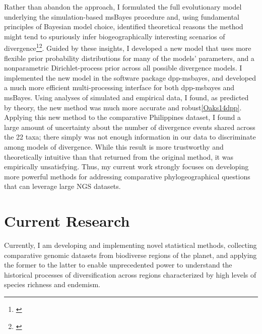 Rather than abandon the approach, I formulated the full evolutionary model
underlying the simulation-based msBayes procedure and, using fundamental
principles of Bayesian model choice, identified theoretical reasons the method
might tend to spuriously infer biogeographically interesting scenarios of
divergence\footnote{\label{Oaks12}}\super{,}\footnote{\label{Oaks14reply}}.
Guided by these insights, I developed a new model that uses more flexible prior
probability distributions for many of the models' parameters, and a
nonparametric Dirichlet-process prior across all possible divergence models.
I implemented the new model in the software package dpp-msbayes, and developed
a much more efficient multi-processing interface for both dpp-msbayes and
msBayes.
Using analyses of simulated and empirical data, I found, as predicted by
theory, the new method was much more accurate and robust\cref{Oaks14dpp}.
Applying this new method to the comparative Philippines dataset, I found a
large amount of uncertainty about the number of divergence events shared across
the 22 taxa; there simply was not enough information in our data to
discriminate among models of divergence.
While this result is more trustworthy and theoretically intuitive than that
returned from the original method, it was empirically unsatisfying.
Thus, my current work strongly focuses on developing more powerful methods for
addressing comparative phylogeographical questions that can leverage large NGS
datasets.


\section*{Current Research}
Currently, I am developing and implementing novel statistical methods,
collecting comparative genomic datasets from biodiverse regions of the planet,
and applying the former to the latter to enable unprecedented power to
understand the historical processes of diversification across regions
characterized by high levels of species richness and endemism.

